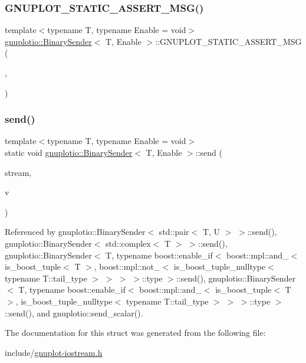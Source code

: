 \subsubsection{\texorpdfstring{G\+N\+U\+P\+L\+O\+T\+\_\+\+S\+T\+A\+T\+I\+C\+\_\+\+A\+S\+S\+E\+R\+T\+\_\+\+M\+S\+G()}{GNUPLOT\_STATIC\_ASSERT\_MSG()}}
{\footnotesize\ttfamily template$<$typename T, typename Enable = void$>$ \\
\hyperlink{structgnuplotio_1_1_binary_sender}{gnuplotio\+::\+Binary\+Sender}$<$ T, Enable $>$\+::G\+N\+U\+P\+L\+O\+T\+\_\+\+S\+T\+A\+T\+I\+C\+\_\+\+A\+S\+S\+E\+R\+T\+\_\+\+M\+SG (\begin{DoxyParamCaption}\item[{(sizeof(T)==0)}]{,  }\item[{\char`\"{}Binary\+Sender$<$ T, Enable $>$ class not specialized for this type\char`\"{}}]{ }\end{DoxyParamCaption})}

\mbox{\label{structgnuplotio_1_1_binary_sender_a4b5dd22b7679c4f0ce4d8e75b36c8a21}} 
\subsubsection{\texorpdfstring{send()}{send()}}
{\footnotesize\ttfamily template$<$typename T, typename Enable = void$>$ \\
static void \hyperlink{structgnuplotio_1_1_binary_sender}{gnuplotio\+::\+Binary\+Sender}$<$ T, Enable $>$\+::send (\begin{DoxyParamCaption}\item[{std\+::ostream \&}]{stream,  }\item[{const T \&}]{v }\end{DoxyParamCaption})\hspace{0.3cm}{\ttfamily [static]}}



Referenced by gnuplotio\+::\+Binary\+Sender$<$ std\+::pair$<$ T, U $>$ $>$\+::send(), gnuplotio\+::\+Binary\+Sender$<$ std\+::complex$<$ T $>$ $>$\+::send(), gnuplotio\+::\+Binary\+Sender$<$ T, typename boost\+::enable\+\_\+if$<$ boost\+::mpl\+::and\+\_\+$<$ is\+\_\+boost\+\_\+tuple$<$ T $>$, boost\+::mpl\+::not\+\_\+$<$ is\+\_\+boost\+\_\+tuple\+\_\+nulltype$<$ typename T\+::tail\+\_\+type $>$ $>$ $>$ $>$\+::type $>$\+::send(), gnuplotio\+::\+Binary\+Sender$<$ T, typename boost\+::enable\+\_\+if$<$ boost\+::mpl\+::and\+\_\+$<$ is\+\_\+boost\+\_\+tuple$<$ T $>$, is\+\_\+boost\+\_\+tuple\+\_\+nulltype$<$ typename T\+::tail\+\_\+type $>$ $>$ $>$\+::type $>$\+::send(), and gnuplotio\+::send\+\_\+scalar().



The documentation for this struct was generated from the following file\+:\begin{DoxyCompactItemize}
\item 
include/\hyperlink{gnuplot-iostream_8h}{gnuplot-\/iostream.\+h}\end{DoxyCompactItemize}
